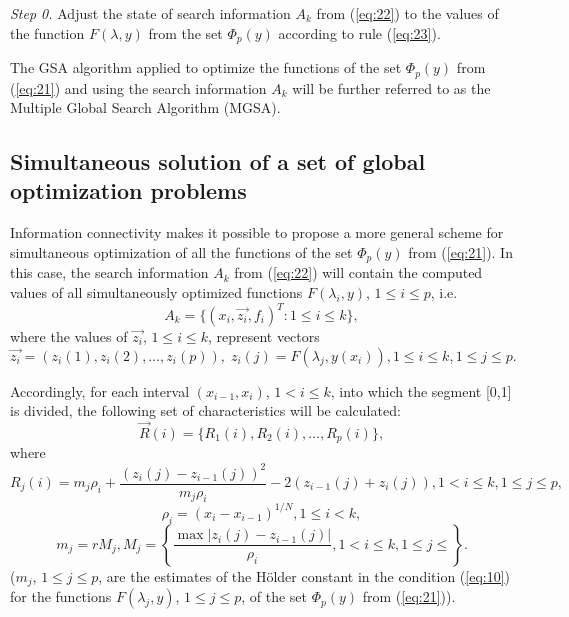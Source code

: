 \documentclass[runningheads]{llncs}
\begin{document}
\textit{Step 0.} Adjust the state of search information $A_k$ from (\ref{eq:22}) to the values of the function $F(\lambda, y)$ from the set $\Phi_p(y)$ according to rule (\ref{eq:23}).

The GSA algorithm applied to optimize the functions of the set $\Phi_p(y)$ from (\ref{eq:21}) and using the search information $A_k$ will be further referred to as the Multiple Global Search Algorithm (MGSA).

\subsection{Simultaneous solution of a set of global optimization problems} 
\label{subsec:43}

Information connectivity makes it possible to propose a more general scheme for simultaneous optimization of all the functions of the set $\Phi_p(y)$ from (\ref{eq:21}). In this case, the search information $A_k$ from (\ref{eq:22}) will contain the computed values of all simultaneously optimized functions $F(\lambda_i, y)$, $1 \leq i \leq p$, i.e. 
\begin{equation}
\label{eq:24}
A_k=\{(x_i,\overrightarrow{z_i},f_i )^T : 1 \leq i \leq k\},
\end{equation}
where the values of $\overrightarrow{z_i}$, $1 \leq i \leq k$, represent vectors 
\begin{equation}
\label{eq:25}
\overrightarrow{z_i}=( z_i (1),z_i (2), \dots ,z_i (p)), \; z_i (j)=F(\lambda_j,y(x_i)), 1\leq i \leq k, 1\leq j\leq p.
\end{equation}

Accordingly, for each interval $(x_{i-1},x_i)$, $1 < i \leq k$, into which the segment [0,1] is divided, the following set of characteristics will be calculated:
\begin{equation}
\label{eq:26}
\overrightarrow{R}(i)=\{R_1(i), R_2(i), \dots, R_p(i)\},
\end{equation}
where
\begin{equation}
\label{eq:27}
R_j(i)=m_j \rho_i+\frac{(z_i(j)-z_{i-1}(j))^2}{m_j \rho_i} - 2(z_{i-1}(j)+z_i(j)),1 < i \leq k,1 \leq j \leq p,
\end{equation}
\begin{equation}
\label{eq:28}
\rho_i=(x_i-x_{i-1} )^{1/N}  ,1 \leq i<k,
\end{equation}
\begin{equation}
\label{eq:29}
m_j = r M_j, M_j=\left\{ \frac{\max|z_i (j)-z_{i-1} (j)|}{\rho_i} ,1< i \leq k, 1 \leq j \leq \right\}.
\end{equation}
($m_j$, $1 \leq j \leq p$, are the estimates of the H{\"o}lder  constant in the condition (\ref{eq:10}) for the functions $F(\lambda_j,y)$, $1 \leq j \leq p$, of the set $\Phi_p(y)$ from (\ref{eq:21})).
\end{document}

